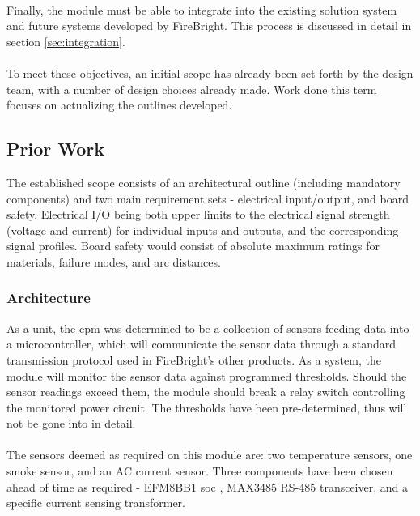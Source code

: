 \documentclass[12pt]{article}
\begin{document}
  \paragraph{}
  Finally, the module must be able to integrate into the existing solution system and future systems developed by FireBright. This process is discussed in detail in section \ref{sec:integration}. 
  
  \paragraph{}
  To meet these objectives, an initial scope has already been set forth by the design team, with a number of design choices already made. Work done this term focuses on actualizing the outlines developed.
	
	\subsection{Prior Work\label{sec:prior-work}}
	The established scope consists of an architectural outline (including mandatory components) and two main requirement sets - electrical input/output, and board safety. Electrical I/O being both upper limits to the electrical signal strength (voltage and current) for individual inputs and outputs, and the corresponding signal profiles. Board safety would consist of absolute maximum ratings for materials, failure modes, and arc distances.
	
    \subsubsection{Architecture\label{sec:architecture}}
    As a unit, the \acrshort{cpm} was determined to be a collection of sensors feeding data into a microcontroller, which will communicate the sensor data through a standard transmission protocol used in FireBright's other products. As a system, the module will monitor the sensor data against programmed thresholds. Should the sensor readings exceed them, the module should break a relay switch controlling the monitored power circuit. The thresholds have been pre-determined, thus will not be gone into in detail. 

    \paragraph{}
    The sensors deemed as required on this module are: two temperature sensors, one smoke sensor, and an AC current sensor. Three components have been chosen ahead of time as required - EFM8BB1 \acrfull{soc} , MAX3485 RS-485 transceiver, and a specific current sensing transformer.
\end{document}
